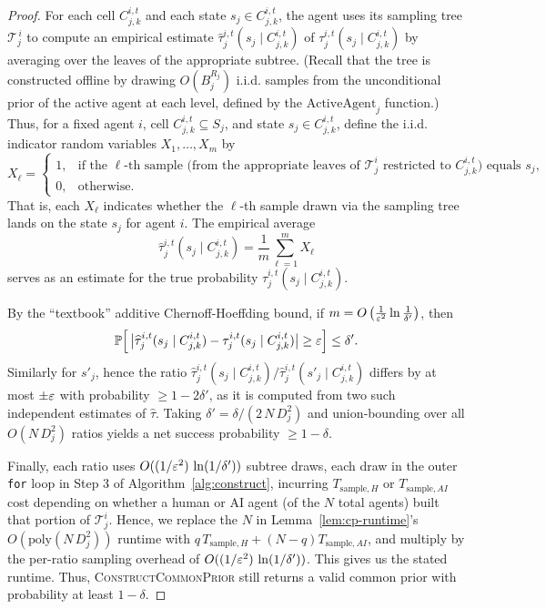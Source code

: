 \begin{proof}
For each cell $C_{j,k}^{i,t}$ and each state $s_j\in C_{j,k}^{i,t}$, the agent uses its sampling tree $\mathcal{T}^{\,i}_j$ to compute an empirical estimate $\widehat{\tau}^{i,t}_j(s_j\mid C_{j,k}^{i,t})$ of $\tau^{i,t}_j(s_j\mid C_{j,k}^{i,t})$ by averaging over the leaves of the appropriate subtree.
(Recall that the tree is constructed offline by drawing $O\left(B_j^{R_j}\right)$ i.i.d. samples from the unconditional prior of the active agent at each level, defined by the $\mathrm{ActiveAgent}_j$ function.)
Thus, for a fixed agent $i$, cell $C_{j,k}^{i,t} \subseteq S_j$, and state $s_j \in C_{j,k}^{i,t}$, define the i.i.d. indicator random variables $X_1, \dots, X_m$ by
\begin{equation*}
X_\ell =
\begin{cases}
1, & \text{if the $\ell$-th sample (from the appropriate leaves of $\mathcal{T}_j^i$ restricted to $C_{j,k}^{i,t}$) equals $s_j$,} \\
0, & \text{otherwise.}
\end{cases}
\end{equation*}
That is, each $X_\ell$ indicates whether the $\ell$-th sample drawn via the sampling tree lands on the state $s_j$ for agent $i$.
The empirical average
\begin{equation*}
\widehat{\tau}^{i,t}_j(s_j \mid C_{j,k}^{i,t}) = \frac{1}{m} \sum_{\ell=1}^{m} X_\ell
\end{equation*}
serves as an estimate for the true probability $\tau^{i,t}_j(s_j \mid C_{j,k}^{i,t})$.

By the ``textbook'' additive Chernoff-Hoeffding bound, if $m=O\left(\tfrac{1}{\varepsilon^2}\ln\tfrac{1}{\delta'}\right)$, then
\begin{equation*}
  \mathbb{P}\Bigl[\,
    \bigl|\widehat{\tau}^{i,t}_j(s_j\mid C_{j,k}^{i,t})
           -\tau^{i,t}_j(s_j\mid C_{j,k}^{i,t})
    \bigr| \ge \varepsilon
  \Bigr] \le \delta'.
\end{equation*}
Similarly for $s'_j$, hence the ratio $\widehat{\tau}^{i,t}_j(s_j\mid C_{j,k}^{i,t})
  \big/
  \widehat{\tau}^{i,t}_j(s'_j\mid C_{j,k}^{i,t})$
differs by at most $\pm\varepsilon$ with probability $\ge 1-2\delta'$, as it is computed from two such independent estimates of $\widehat{\tau}$.  
Taking $\delta'=\delta/(2\,N\,D_j^2)$ and union‐bounding over all
$O(N\,D_j^2)$ ratios yields a net success probability $\ge 1-\delta$.

Finally, each ratio uses $O((1/\varepsilon^2)\,\ln(1/\delta'))$ subtree draws, each draw in the outer \texttt{for} loop in Step 3 of Algorithm~\ref{alg:construct}, incurring $T_{\mathrm{sample},H}$ or $T_{\mathrm{sample},AI}$ cost depending on whether a human or AI agent (of the $N$ total agents) built that portion of $\mathcal{T}^i_j$.
Hence, we replace the $N$ in Lemma~\ref{lem:cp-runtime}'s $O\left(\textrm{poly}\left(N\, D_j^2\right)\right)$ runtime with $q\,T_{\text{sample},H}+(N-q)T_{\text{sample},AI}$, and multiply by the per-ratio sampling overhead of $O((1/\varepsilon^2)\,\ln(1/\delta'))$.
This gives us the stated runtime.
Thus, \textsc{ConstructCommonPrior} still returns a valid
common prior with probability at least $1-\delta$.
\end{proof}

